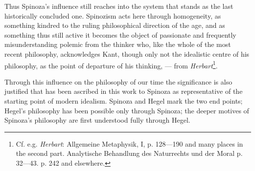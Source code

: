 \documentclass[12pt,a4paper,openany]{book}
\begin{document}
Thus Spinoza's influence still reaches into the
system that stands as the last historically concluded one. Spinozism
acts here through homogeneity, as something kindred to
the ruling philosophical direction of the age, and
as something thus still active it becomes the object of passionate
and frequently misunderstanding polemic from the thinker
who, like the whole of the most recent philosophy, acknowledges Kant,
though only not the idealistic centre of his philosophy, as
the point of departure of his thinking, --- from \emph{Herbart}\footnote{Cf. e.g. \emph{Herbart}: Allgemeine Metaphysik, I, p. 128---190 and
many places in the second part. Analytische Behandlung des Naturrechts
und der Moral p. 32---43. p. 242 and elsewhere.}.

Through this influence on the philosophy of our time
the significance is also justified that has been ascribed in this work to
Spinoza as representative of the starting point of
modern idealism. Spinoza and Hegel mark the two end points;
Hegel's philosophy has been possible only through Spinoza;
the deeper motives of Spinoza's philosophy are first understood
fully through Hegel.
\end{document}

